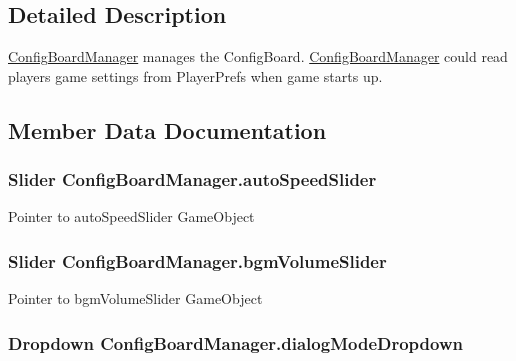 \subsection{Detailed Description}
\hyperlink{class_config_board_manager}{Config\+Board\+Manager} manages the Config\+Board. \hyperlink{class_config_board_manager}{Config\+Board\+Manager} could read player\textquotesingle{}s game settings from Player\+Prefs when game starts up. 



\subsection{Member Data Documentation}
\subsubsection[{\texorpdfstring{auto\+Speed\+Slider}{autoSpeedSlider}}]{\setlength{\rightskip}{0pt plus 5cm}Slider Config\+Board\+Manager.\+auto\+Speed\+Slider}\hypertarget{class_config_board_manager_ae3d91aa8030f55ac2decbc34d69f2b12}{}\label{class_config_board_manager_ae3d91aa8030f55ac2decbc34d69f2b12}


Pointer to auto\+Speed\+Slider Game\+Object 

\subsubsection[{\texorpdfstring{bgm\+Volume\+Slider}{bgmVolumeSlider}}]{\setlength{\rightskip}{0pt plus 5cm}Slider Config\+Board\+Manager.\+bgm\+Volume\+Slider}\hypertarget{class_config_board_manager_a9bc08e2602aca77565d75718cef4c31c}{}\label{class_config_board_manager_a9bc08e2602aca77565d75718cef4c31c}


Pointer to bgm\+Volume\+Slider Game\+Object 

\subsubsection[{\texorpdfstring{dialog\+Mode\+Dropdown}{dialogModeDropdown}}]{\setlength{\rightskip}{0pt plus 5cm}Dropdown Config\+Board\+Manager.\+dialog\+Mode\+Dropdown}\hypertarget{class_config_board_manager_a736234c5393058ed45b77be529292cee}{}\label{class_config_board_manager_a736234c5393058ed45b77be529292cee}



